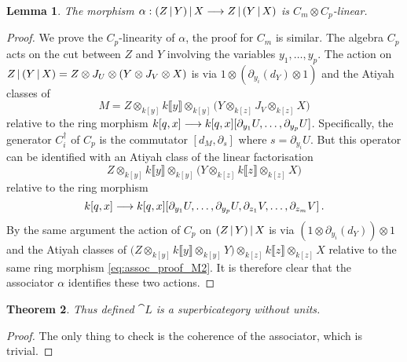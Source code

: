 \documentclass[english,letter paper,12pt,leqno]{article}
\newtheorem{theorem}{Theorem}[section]
\newtheorem{lemma}[theorem]{Lemma}
\theoremstyle{example}
\numberwithin{equation}{section}
\begin{document}
\begin{lemma}\label{lemma:associator} The morphism $\alpha: (Z \,|\, Y) \,|\, X \longrightarrow Z \,|\, (Y \,|\, X)$ is $C_m \otimes C_p$-linear.
\end{lemma}
\begin{proof}
We prove the $C_p$-linearity of $\alpha$, the proof for $C_m$ is similar. The algebra $C_p$ acts on the cut between $Z$ and $Y$ involving the variables $y_1,\ldots,y_p$. The action on $Z \,|\, ( Y \,|\, X ) = Z \otimes J_U \otimes (Y \otimes J_V \otimes X)$ is via $1 \otimes (\partial_{y_i}(d_Y) \otimes 1)$ and the Atiyah classes of 
\[
M = Z \otimes_{k[y]} k\llbracket y \rrbracket \otimes_{k[y]} \big( Y \otimes_{k[z]} J_V \otimes_{k[z]} X \big)
\]
relative to the ring morphism $k[q,x] \longrightarrow k[q,x] [ \partial_{y_1} U, \ldots, \partial_{y_p} U ]$. Specifically, the generator $C_i^{\dagger}$ of $C_p$ is the commutator $[d_{M}, \partial_s]$ where $s = \partial_{y_i} U$. But this operator can be identified with an Atiyah class of the linear factorisation
\begin{equation}\label{eq:assoc_proof_M}
Z \otimes_{k[y]} k\llbracket y \rrbracket \otimes_{k[y]} \big( Y \otimes_{k[z]} k\llbracket z \rrbracket \otimes_{k[z]} X \big)
\end{equation}
relative to the ring morphism
\begin{equation}\label{eq:assoc_proof_M2}
k[q,x] \longrightarrow k[q,x] [ \partial_{y_1} U, \ldots, \partial_{y_p} U, \partial_{z_1} V, \ldots, \partial_{z_m} V ]\,.
\end{equation}
By the same argument the action of $C_p$ on $(Z \,|\, Y ) \,|\, X$ is via $(1 \otimes \partial_{y_i}(d_Y)) \otimes 1$ and the Atiyah classes of $\big( Z \otimes_{k[y]} k\llbracket y \rrbracket \otimes_{k[y]} Y \big) \otimes_{k[z]} k\llbracket z \rrbracket \otimes_{k[z]} X$ relative to the same ring morphism \eqref{eq:assoc_proof_M2}. It is therefore clear that the associator $\alpha$ identifies these two actions.
\end{proof}

\begin{theorem} Thus defined $\cat{L}$ is a superbicategory without units.
\end{theorem}
\begin{proof}
The only thing to check is the coherence of the associator, which is trivial.
\end{proof}
\end{document}
